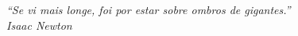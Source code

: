\begin{epigrafe}
    \vspace*{\fill}
	\begin{flushright}
		\textit{``Se vi mais longe, foi por estar sobre ombros de gigantes.''\\
        Isaac Newton}
	\end{flushright}
\end{epigrafe}
